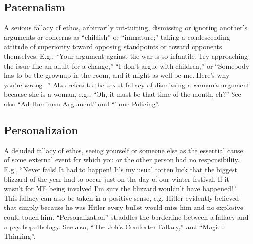 \documentclass[10pt,a4paper,british]{article}
\begin{document}
\begin{multicols}{2}
    \subsection{Paternalism} A serious fallacy of ethos, arbitrarily tut{-}tutting, dismissing or ignoring another's arguments or concerns as ``childish'' or ``immature;'' taking a condescending attitude of superiority toward opposing standpoints or toward opponents themselves. E.g., ``Your argument against the war is so infantile. Try approaching the issue like an adult for a change,'' ``I don't argue with children,'' or ``Somebody has to be the grownup in the room, and it might as well be me. Here's why you're wrong\ldots''  Also refers to the sexist fallacy of dismissing a woman's argument because she is a woman, e.g., ``Oh, it must be that time of the month, eh?'' See also ``Ad Hominem Argument'' and ``Tone Policing''.  

    \subsection{Personalizaion} A deluded fallacy of ethos, seeing yourself or someone else as the essential cause of some external event for which you or the other person had no responsibility. E.g., ``Never fails! It had to happen! It's my usual rotten luck that the biggest blizzard of the year had to occur just on the day of our winter festival. If it wasn't for ME being involved I'm sure the blizzard wouldn't have happened!'' This fallacy can also be taken in a positive sense, e.g. Hitler evidently believed that simply because he was Hitler every bullet would miss him and no explosive could touch him. ``Personalization'' straddles the borderline between a fallacy and a psychopathology. See also, ``The Job's Comforter Fallacy,'' and ``Magical Thinking''.  


\end{multicols}
\end{document}
